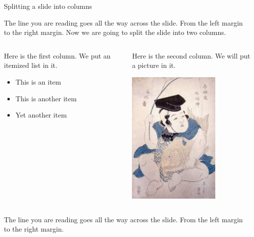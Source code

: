 \documentclass{beamer}
\begin{document}
\begin{frame}{Splitting a slide into columns}

The line you are reading goes all the way across the slide.
From the left margin to the right margin.  Now we are going
to split the slide into two columns.
\bigskip

\begin{columns}
  \begin{column}{0.5\textwidth}
    Here is the first column.  We put an itemized list in it.
    \begin{itemize}
      \item This is an item
      \item This is another item
      \item Yet another item
    \end{itemize}
  \end{column}

  \begin{column}{0.3\textwidth}
    Here is the second column.  We will put a picture in it.
    \centerline{\includegraphics[width=0.7\textwidth]{image2.png}}
  \end{column}
\end{columns}
\bigskip

The line you are reading goes all the way across the slide.
From the left margin to the right margin.

\end{frame}
\end{document}
